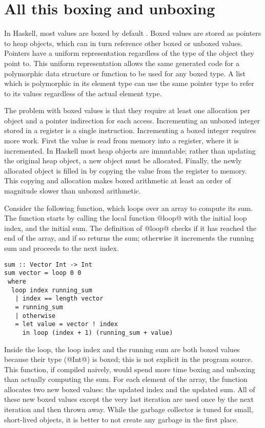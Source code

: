 \section{All this boxing and unboxing}

In Haskell, most values are boxed by default \citep{jones1991unboxed}.
Boxed values are stored as pointers to heap objects, which can in turn reference other boxed or unboxed values.
Pointers have a uniform representation regardless of the type of the object they point to.
This uniform representation allows the same generated code for a polymorphic data structure or function to be used for any boxed type.
A list which is polymorphic in its element type can use the same pointer type to refer to its values regardless of the actual element type.

The problem with boxed values is that they require at least one allocation per object and a pointer indirection for each access.
Incrementing an unboxed integer stored in a register is a single instruction.
Incrementing a boxed integer requires more work.
First the value is read from memory into a register, where it is incremented.
In Haskell most heap objects are immutable; rather than updating the original heap object, a new object must be allocated.
Finally, the newly allocated object is filled in by copying the value from the register to memory.
This copying and allocation makes boxed arithmetic at least an order of magnitude slower than unboxed arithmetic.

Consider the following function, which loops over an array to compute its sum.
The function starts by calling the local function @loop@ with the initial loop index, and the initial sum.
The definition of @loop@ checks if it has reached the end of the array, and if so returns the sum; otherwise it increments the running sum and proceeds to the next index.

\begin{lstlisting}
sum :: Vector Int -> Int
sum vector = loop 0 0
 where
  loop index running_sum
   | index == length vector
   = running_sum
   | otherwise
   = let value = vector ! index
     in loop (index + 1) (running_sum + value)
\end{lstlisting}

Inside the loop, the loop index and the running sum are both boxed values because their type (@Int@) is boxed; this is not explicit in the program source.
This function, if compiled naively, would spend more time boxing and unboxing than actually computing the sum.
For each element of the array, the function allocates two new boxed values: the updated index and the updated sum.
All of these new boxed values except the very last iteration are used once by the next iteration and then thrown away.
While the garbage collector is tuned for small, short-lived objects, it is better to not create any garbage in the first place.

